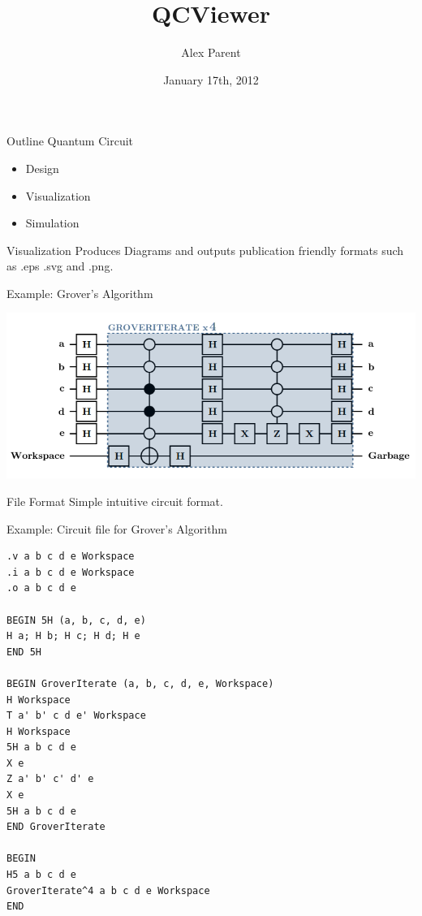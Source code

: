 \documentclass{beamer}
\title{QCViewer}
\author{Alex Parent}
\institute{University of Waterloo, IQC}
\date{January 17th, 2012}
\begin{document}
\begin{frame}
\titlepage
\end{frame}

\begin{frame}{Outline}
Quantum Circuit
\begin{itemize}
\item Design
\item Visualization 
\item Simulation  
\end{itemize}
\end{frame}

\begin{frame}{Visualization}
Produces Diagrams and outputs publication friendly formats 
such as .eps .svg and .png.

Example: Grover's Algorithm 
\begin{center}
\includegraphics[scale=0.32]{grover_circuit}
\end{center}
\end{frame}

\begin{frame}[fragile]{File Format}
Simple intuitive circuit format.

Example: Circuit file for Grover's Algorithm
\begin{center}
\begin{tiny}
\begin{BVerbatim}[boxwidth=auto]
.v a b c d e Workspace
.i a b c d e Workspace
.o a b c d e

BEGIN 5H (a, b, c, d, e)
H a; H b; H c; H d; H e
END 5H

BEGIN GroverIterate (a, b, c, d, e, Workspace)
H Workspace
T a' b' c d e' Workspace
H Workspace
5H a b c d e
X e
Z a' b' c' d' e
X e
5H a b c d e
END GroverIterate

BEGIN
H5 a b c d e
GroverIterate^4 a b c d e Workspace
END
\end{BVerbatim}
\end{tiny}

\end{center}

\end{frame}
\end{document}
